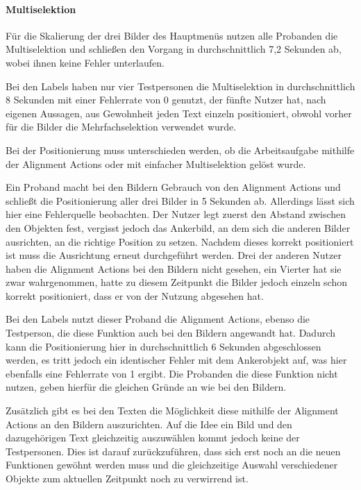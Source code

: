 \paragraph{Multiselektion}
Für die Skalierung der drei Bilder des Hauptmenüs nutzen alle Probanden die Multiselektion und schließen den Vorgang in durchschnittlich 7,2 Sekunden ab, wobei ihnen keine Fehler unterlaufen.

Bei den Labels haben nur vier Testpersonen die Multiselektion in durchschnittlich 8 Sekunden mit einer Fehlerrate von 0 genutzt, der fünfte Nutzer hat, nach eigenen Aussagen, aus Gewohnheit jeden Text einzeln positioniert, obwohl vorher für die Bilder die Mehrfachselektion verwendet wurde.

Bei der Positionierung muss unterschieden werden, ob die Arbeitsaufgabe mithilfe der Alignment Actions oder mit einfacher Multiselektion gelöst wurde.

Ein Proband macht bei den Bildern Gebrauch von den Alignment Actions und schließt die Positionierung aller drei Bilder in 5 Sekunden ab.
Allerdings lässt sich hier eine Fehlerquelle beobachten.
Der Nutzer legt zuerst den Abstand zwischen den Objekten fest, vergisst jedoch das Ankerbild, an dem sich die anderen Bilder ausrichten, an die richtige Position zu setzen.
Nachdem dieses korrekt positioniert ist muss die Ausrichtung erneut durchgeführt werden.
Drei der anderen Nutzer haben die Alignment Actions bei den Bildern nicht gesehen, ein Vierter hat sie zwar wahrgenommen, hatte zu diesem Zeitpunkt die Bilder jedoch einzeln schon korrekt positioniert, dass er von der Nutzung abgesehen hat.

Bei den Labels nutzt dieser Proband die Alignment Actions, ebenso die Testperson, die diese Funktion auch bei den Bildern angewandt hat.
Dadurch kann die Positionierung hier in durchschnittlich 6 Sekunden abgeschlossen werden, es tritt jedoch ein identischer Fehler mit dem Ankerobjekt auf, was hier ebenfalls eine Fehlerrate von 1 ergibt.
Die Probanden die diese Funktion nicht nutzen, geben hierfür die gleichen Gründe an wie bei den Bildern.

Zusätzlich gibt es bei den Texten die Möglichkeit diese mithilfe der Alignment Actions an den Bildern auszurichten.
Auf die Idee ein Bild und den dazugehörigen Text gleichzeitig auszuwählen kommt jedoch keine der Testpersonen.
Dies ist darauf zurückzuführen, dass sich erst noch an die neuen Funktionen gewöhnt werden muss und die gleichzeitige Auswahl verschiedener Objekte zum aktuellen Zeitpunkt noch zu verwirrend ist.

